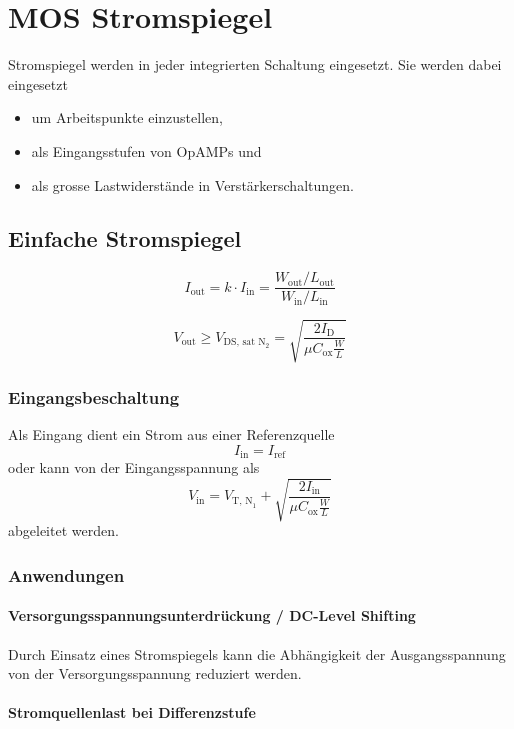 \section{MOS Stromspiegel}
Stromspiegel werden in jeder integrierten Schaltung eingesetzt.
Sie werden dabei eingesetzt
\begin{itemize}
    \item um Arbeitspunkte einzustellen,
    \item als Eingangsstufen von OpAMPs und
    \item als grosse Lastwiderstände in Verstärkerschaltungen.
\end{itemize}

\subsection{Einfache Stromspiegel}

\[
    I_\text{out} = k \cdot I_\text{in} = \frac{W_\text{out}/L_\text{out}}{W_\text{in}/L_\text{in}}
\]

\[
    V_\text{out} \geq V_\text{DS, sat $\text{N}_2$} = \sqrt{\frac{2 I_\text{D}}{\mu C_\text{ox}\frac{W}{L}}}
\]


\subsubsection{Eingangsbeschaltung}
Als Eingang dient ein Strom aus einer Referenzquelle
\[
    I_\text{in} = I_\text{ref}
\]
oder kann von der Eingangsspannung als
\[
    V_\text{in} = V_{\text{T, N}_1} + \sqrt{\frac{2 I_\text{in}}{\mu C_\text{ox}\frac{W}{L}}}
\]
abgeleitet werden.

\subsubsection{Anwendungen}
\paragraph{Versorgungsspannungsunterdrückung / DC-Level Shifting}
Durch Einsatz eines Stromspiegels kann die Abhängigkeit der Ausgangsspannung von der Versorgungsspannung reduziert werden.

\paragraph{Stromquellenlast bei Differenzstufe}

